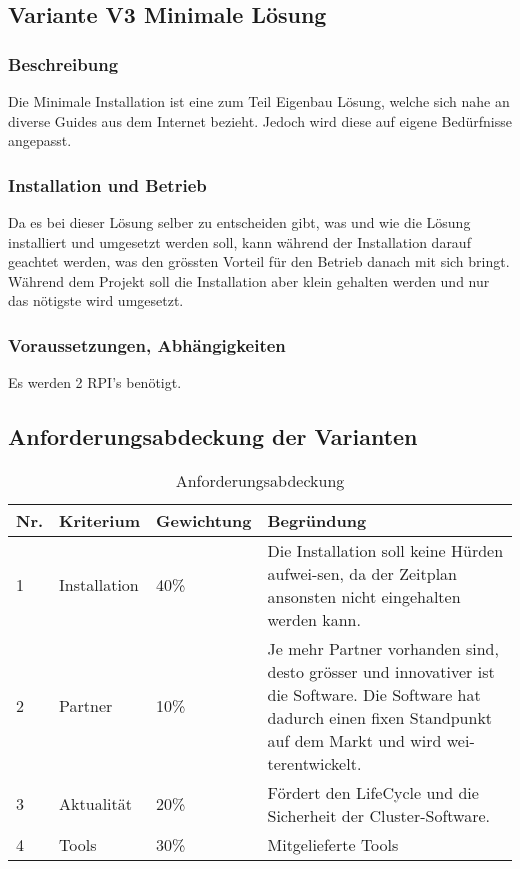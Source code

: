 \subsection{Variante V3 \flqq Minimale Lösung\frqq}
\subsubsection{Beschreibung}
Die Minimale Installation ist eine zum Teil Eigenbau Lösung, welche sich nahe an diverse Guides aus dem Internet bezieht. Jedoch wird diese auf eigene Bedürfnisse angepasst.

\subsubsection{Installation und Betrieb}
Da es bei dieser Lösung selber zu entscheiden gibt, was und wie die Lösung installiert und umgesetzt werden soll, kann während der Installation darauf geachtet werden, was den grössten Vorteil für den Betrieb danach mit sich bringt. Während dem Projekt soll die Installation aber klein gehalten werden und nur das nötigste wird umgesetzt. 

\subsubsection{Voraussetzungen, Abhängigkeiten}
Es werden 2 RPI's benötigt.

\subsection{Anforderungsabdeckung der Varianten}

\begin{table}[H]
\centering
\begin{tabular}{p{1cm}p{2.5cm}p{2.2cm}p{10.3cm}}
\hline
\rowcolor{heading} \textbf{Nr.} & \textbf{Kriterium} & \textbf{Gewichtung} &\textbf{Begründung} \\\hline
1 & Installation & 40\% & Die Installation soll keine Hürden aufwei-sen, da der Zeitplan ansonsten nicht eingehalten werden kann. \\\hline
2 & Partner & 10\% & Je mehr Partner vorhanden sind, desto grösser und innovativer ist die Software. Die Software hat dadurch einen fixen Standpunkt auf dem Markt und wird wei-terentwickelt. \\\hline
3 & Aktualität & 20\% & Fördert den LifeCycle und die Sicherheit der Cluster-Software. \\\hline
4 & Tools & 30\% & Mitgelieferte Tools \\\hline
\end{tabular}
\caption{Anforderungsabdeckung}
\end{table}

